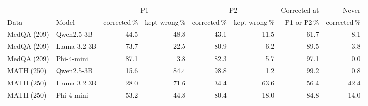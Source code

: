 \begin{tabular}{ll rr rr rr}
\toprule
& & \multicolumn{2}{c}{P1} & \multicolumn{2}{c}{P2} & Corrected at & Never\\
\cmidrule(lr){3-4}\cmidrule(lr){5-6}
Data & Model & corrected\,\% & kept wrong\,\% & corrected\,\% & kept wrong\,\% & P1 or P2\,\% & corrected\,\%\\
\midrule
MedQA (209) & Qwen2.5-3B & 44.5 & 48.8 & 43.1 & 11.5 & 61.7 & 8.1\\
MedQA (209) & Llama-3.2-3B & 73.7 & 22.5 & 80.9 & 6.2 & 89.5 & 3.8\\
MedQA (209) & Phi-4-mini & 87.1 & 3.8 & 82.3 & 5.7 & 97.1 & 0.0\\
\midrule
MATH (250) & Qwen2.5-3B & 15.6 & 84.4 & 98.8 & 1.2 & 99.2 & 0.8\\
MATH (250) & Llama-3.2-3B & 28.0 & 71.6 & 34.4 & 63.6 & 56.4 & 42.4\\
MATH (250) & Phi-4-mini & 53.2 & 44.8 & 80.4 & 18.0 & 84.8 & 14.0\\
\bottomrule
\end{tabular}